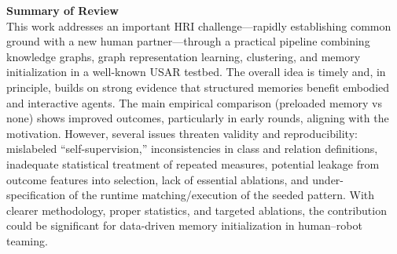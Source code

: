 \documentclass[letterpaper]{article} %
\begin{document}
\textbf{Summary of Review}\\
This work addresses an important HRI challenge—rapidly establishing common ground with a new human partner—through a practical pipeline combining knowledge graphs, graph representation learning, clustering, and memory initialization in a well-known USAR testbed. The overall idea is timely and, in principle, builds on strong evidence that structured memories benefit embodied and interactive agents. The main empirical comparison (preloaded memory vs none) shows improved outcomes, particularly in early rounds, aligning with the motivation. However, several issues threaten validity and reproducibility: mislabeled “self-supervision,” inconsistencies in class and relation definitions, inadequate statistical treatment of repeated measures, potential leakage from outcome features into selection, lack of essential ablations, and under-specification of the runtime matching/execution of the seeded pattern. With clearer methodology, proper statistics, and targeted ablations, the contribution could be significant for data-driven memory initialization in human–robot teaming.
\end{document}

